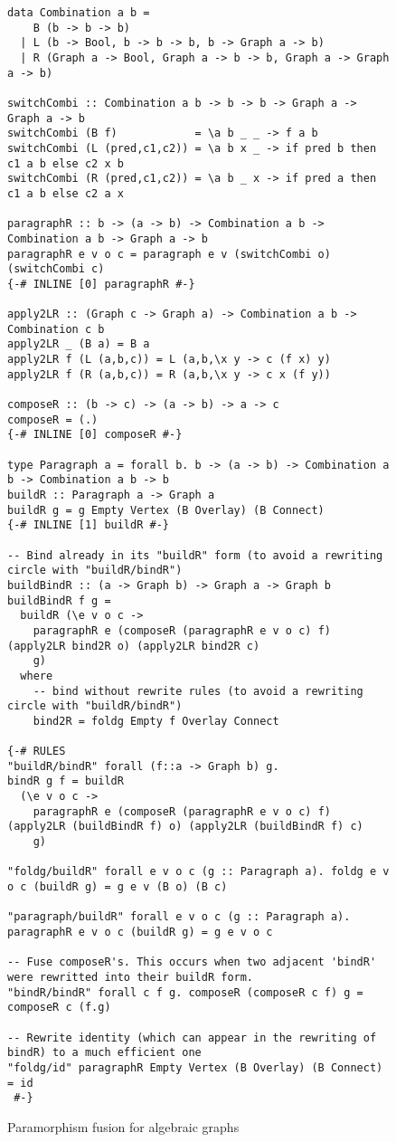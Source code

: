 \begin{figure*}
\begin{verbatim}
data Combination a b =
    B (b -> b -> b)
  | L (b -> Bool, b -> b -> b, b -> Graph a -> b)
  | R (Graph a -> Bool, Graph a -> b -> b, Graph a -> Graph a -> b)

switchCombi :: Combination a b -> b -> b -> Graph a -> Graph a -> b
switchCombi (B f)            = \a b _ _ -> f a b
switchCombi (L (pred,c1,c2)) = \a b x _ -> if pred b then c1 a b else c2 x b
switchCombi (R (pred,c1,c2)) = \a b _ x -> if pred a then c1 a b else c2 a x
  
paragraphR :: b -> (a -> b) -> Combination a b -> Combination a b -> Graph a -> b
paragraphR e v o c = paragraph e v (switchCombi o) (switchCombi c)
{-# INLINE [0] paragraphR #-}

apply2LR :: (Graph c -> Graph a) -> Combination a b -> Combination c b
apply2LR _ (B a) = B a
apply2LR f (L (a,b,c)) = L (a,b,\x y -> c (f x) y)
apply2LR f (R (a,b,c)) = R (a,b,\x y -> c x (f y))

composeR :: (b -> c) -> (a -> b) -> a -> c
composeR = (.)
{-# INLINE [0] composeR #-}

type Paragraph a = forall b. b -> (a -> b) -> Combination a b -> Combination a b -> b
buildR :: Paragraph a -> Graph a
buildR g = g Empty Vertex (B Overlay) (B Connect)
{-# INLINE [1] buildR #-}

-- Bind already in its "buildR" form (to avoid a rewriting circle with "buildR/bindR")
buildBindR :: (a -> Graph b) -> Graph a -> Graph b
buildBindR f g = 
  buildR (\e v o c -> 
    paragraphR e (composeR (paragraphR e v o c) f) (apply2LR bind2R o) (apply2LR bind2R c) 
    g)
  where
    -- bind without rewrite rules (to avoid a rewriting circle with "buildR/bindR")
    bind2R = foldg Empty f Overlay Connect
    
{-# RULES
"buildR/bindR" forall (f::a -> Graph b) g.
bindR g f = buildR 
  (\e v o c -> 
    paragraphR e (composeR (paragraphR e v o c) f) (apply2LR (buildBindR f) o) (apply2LR (buildBindR f) c)
    g)

"foldg/buildR" forall e v o c (g :: Paragraph a). foldg e v o c (buildR g) = g e v (B o) (B c)

"paragraph/buildR" forall e v o c (g :: Paragraph a). paragraphR e v o c (buildR g) = g e v o c

-- Fuse composeR's. This occurs when two adjacent 'bindR' were rewritted into their buildR form.
"bindR/bindR" forall c f g. composeR (composeR c f) g = composeR c (f.g)

-- Rewrite identity (which can appear in the rewriting of bindR) to a much efficient one
"foldg/id" paragraphR Empty Vertex (B Overlay) (B Connect) = id
 #-}
\end{verbatim}
\caption{Paramorphism fusion for algebraic graphs}
\label{fig:parafus}
\end{figure*}

